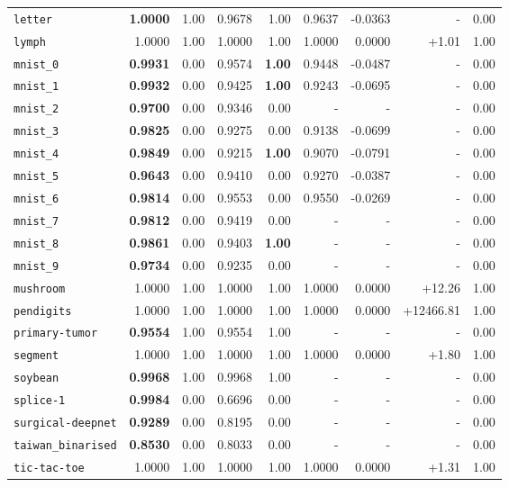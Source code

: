 \begin{tabular}{lrrrrrrrr}
\texttt{letter} & \textbf{1.0000} & 1.00 & 0.9678 & 1.00 & 0.9637 & -0.0363 & - & 0.00\\
\texttt{lymph} & 1.0000 & 1.00 & 1.0000 & 1.00 & 1.0000 & 0.0000 & +1.01 & 1.00\\
\texttt{mnist\_0} & \textbf{0.9931} & 0.00 & 0.9574 & \textbf{1.00} & 0.9448 & -0.0487 & - & 0.00\\
\texttt{mnist\_1} & \textbf{0.9932} & 0.00 & 0.9425 & \textbf{1.00} & 0.9243 & -0.0695 & - & 0.00\\
\texttt{mnist\_2} & \textbf{0.9700} & 0.00 & 0.9346 & 0.00 & - & - & - & 0.00\\
\texttt{mnist\_3} & \textbf{0.9825} & 0.00 & 0.9275 & 0.00 & 0.9138 & -0.0699 & - & 0.00\\
\texttt{mnist\_4} & \textbf{0.9849} & 0.00 & 0.9215 & \textbf{1.00} & 0.9070 & -0.0791 & - & 0.00\\
\texttt{mnist\_5} & \textbf{0.9643} & 0.00 & 0.9410 & 0.00 & 0.9270 & -0.0387 & - & 0.00\\
\texttt{mnist\_6} & \textbf{0.9814} & 0.00 & 0.9553 & 0.00 & 0.9550 & -0.0269 & - & 0.00\\
\texttt{mnist\_7} & \textbf{0.9812} & 0.00 & 0.9419 & 0.00 & - & - & - & 0.00\\
\texttt{mnist\_8} & \textbf{0.9861} & 0.00 & 0.9403 & \textbf{1.00} & - & - & - & 0.00\\
\texttt{mnist\_9} & \textbf{0.9734} & 0.00 & 0.9235 & 0.00 & - & - & - & 0.00\\
\texttt{mushroom} & 1.0000 & 1.00 & 1.0000 & 1.00 & 1.0000 & 0.0000 & +12.26 & 1.00\\
\texttt{pendigits} & 1.0000 & 1.00 & 1.0000 & 1.00 & 1.0000 & 0.0000 & +12466.81 & 1.00\\
\texttt{primary-tumor} & \textbf{0.9554} & 1.00 & 0.9554 & 1.00 & - & - & - & 0.00\\
\texttt{segment} & 1.0000 & 1.00 & 1.0000 & 1.00 & 1.0000 & 0.0000 & +1.80 & 1.00\\
\texttt{soybean} & \textbf{0.9968} & 1.00 & 0.9968 & 1.00 & - & - & - & 0.00\\
\texttt{splice-1} & \textbf{0.9984} & 0.00 & 0.6696 & 0.00 & - & - & - & 0.00\\
\texttt{surgical-deepnet} & \textbf{0.9289} & 0.00 & 0.8195 & 0.00 & - & - & - & 0.00\\
\texttt{taiwan\_binarised} & \textbf{0.8530} & 0.00 & 0.8033 & 0.00 & - & - & - & 0.00\\
\texttt{tic-tac-toe} & 1.0000 & 1.00 & 1.0000 & 1.00 & 1.0000 & 0.0000 & +1.31 & 1.00\\

\end{tabular}
